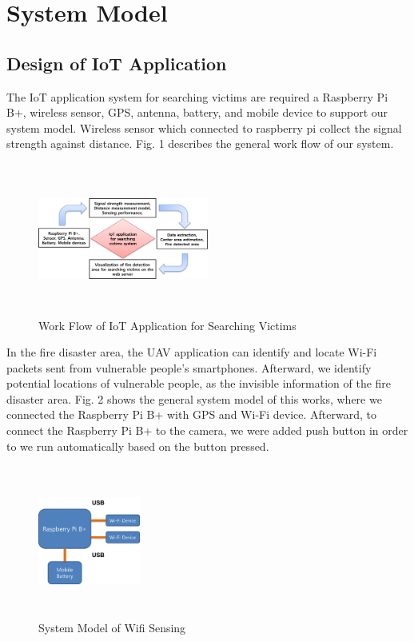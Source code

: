 \documentclass[twocolumn,10pt]{asme2ej}
\begin{document}
	\section{System Model}
	\subsection{Design of IoT Application}
	The IoT application system for searching victims are required a Raspberry Pi B+, wireless sensor, GPS, antenna, battery, and mobile device to support our system model. Wireless sensor which connected to raspberry pi collect the signal strength against distance. Fig. 1 describes the general work flow of our system.
	
	\begin{figure}[t]
		\begin{center}
			\setlength{\unitlength}{0.012500in}%
			\includegraphics[width=0.5\textwidth,height=50mm]{WorkFlow.png}
		\end{center}
		\caption{Work Flow of IoT Application for Searching Victims}
		\label{Work_Flow} 
	\end{figure}
	
	In the fire disaster area, the UAV application can identify and locate Wi-Fi packets sent from vulnerable people's smartphones. Afterward, we identify potential locations of vulnerable people, as the invisible information of the fire disaster area. Fig. 2 shows the general system model of this works, where we connected the Raspberry Pi B+ with GPS and Wi-Fi device. Afterward, to connect the Raspberry Pi B+ to the camera, we were added push button in order to we run automatically based on the button pressed.
	
	\begin{figure}[t]
		\begin{center}
			\setlength{\unitlength}{0.012500in}%
			\includegraphics[width=0.3\textwidth,height=50mm]{Fig1_SystemModel}
		\end{center}
		\caption{System Model of Wifi Sensing}
		\label{System_Model} 
	\end{figure}
	
\end{document}
